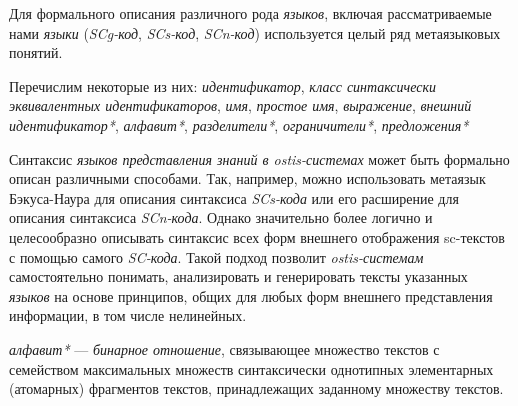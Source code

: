 \begin{SCn}


    \begin{scnindent}
    \end{scnindent}

\end{SCn}

Для формального описания различного рода \textit{языков}, включая рассматриваемые нами \textit{языки} (\textit{SCg-код}, \textit{SCs-код}, \textit{SCn-код}) используется целый ряд метаязыковых понятий.

Перечислим некоторые из них: \textit{идентификатор}, \textit{класс синтаксически эквивалентных идентификаторов}, \textit{имя}, \textit{простое имя}, \textit{выражение}, \textit{внешний идентификатор*}, \textit{алфавит*}, \textit{разделители*}, \textit{ограничители*}, \textit{предложения*}

Синтаксис \textit{языков представления знаний в ostis-системах} может быть формально описан различными способами.
Так, например, можно использовать метаязык Бэкуса-Наура для описания синтаксиса \textit{SCs-кода} или его расширение для описания синтаксиса \textit{SCn-кода}.
Однако значительно более логично и целесообразно описывать синтаксис всех форм внешнего отображения sc-текстов с помощью самого \textit{SC-кода}.
Такой подход позволит \textit{ostis-системам} самостоятельно понимать, анализировать и генерировать тексты указанных \textit{языков} на основе принципов, общих для любых форм внешнего представления информации, в том числе нелинейных.

\textit{алфавит*} --- \textit{бинарное отношение}, связывающее множество текстов с  семейством максимальных множеств синтаксически однотипных элементарных (атомарных) фрагментов текстов, принадлежащих заданному множеству текстов.



